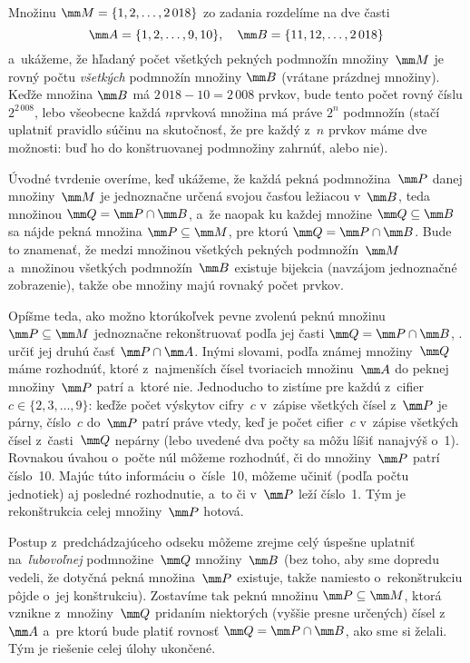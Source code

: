 {%
Množinu $\mm M=\{1,2,\dots,2\,018\}$ zo zadania rozdelíme na dve časti
$$
\mm A=\{1,2,\dots,9,10\},\quad \mm B=\{11,12,\dots,2\,018\}
$$
a~ukážeme, že hľadaný počet všetkých pekných podmnožín množiny~$\mm M$
je rovný počtu {\it všetkých\/} podmnožín množiny $\mm B$ (vrátane
prázdnej množiny). Keďže množina $\mm B$ má ${2\,018-10}=2\,008$
prvkov, bude tento počet rovný číslu $2^{2\,008}$, lebo všeobecne každá
$n$\spojovnik{}prvková množina má práve $2^n$ podmnožín (stačí uplatniť pravidlo
súčinu na skutočnosť, že pre každý z~$n$ prvkov máme dve
možnosti: buď ho do konštruovanej podmnožiny zahrnúť, alebo
nie).

Úvodné tvrdenie overíme, keď ukážeme, že každá pekná podmnožina~$\mm P$
danej množiny~$\mm M$ je jednoznačne určená svojou časťou ležiacou
v~$\mm B$, teda množinou $\mm Q=\mm P\cap \mm B$, a~že naopak ku každej množine
$\mm Q\subseteq \mm B$ sa nájde pekná množina $\mm P\subseteq \mm M$, pre ktorú
$\mm Q=\mm P\cap \mm B$. Bude to znamenať, že medzi množinou všetkých pekných
podmnožín~$\mm M$ a~množinou všetkých podmnožín~$\mm B$ existuje bijekcia (navzájom
jednoznačné zobrazenie), takže obe množiny majú rovnaký počet
prvkov.

Opíšme teda, ako možno ktorúkoľvek pevne zvolenú
peknú množinu $\mm P\subseteq \mm M$ jednoznačne rekonštruovať
podľa jej časti $\mm Q=\mm P\cap \mm B$, \tj. určiť jej druhú časť
$\mm P\cap \mm A$. Inými slovami, podľa známej množiny~$\mm Q$ máme rozhodnúť,
ktoré z~najmenších čísel tvoriacich
množinu~$\mm A$ do peknej množiny~$\mm P$ patrí a~ktoré nie.
Jednoducho to zistíme pre každú z~cifier
$c\in\{2,3,\dots,9\}$: keďže počet výskytov cifry~$c$ v~zápise
všetkých čísel z~$\mm P$ je párny, číslo~$c$ do~$\mm P$ patrí práve vtedy, keď
je počet cifier~$c$ v~zápise všetkých čísel z~časti~$\mm Q$ nepárny
(lebo uvedené dva počty sa môžu líšiť nanajvýš o~1). Rovnakou
úvahou o~počte núl môžeme rozhodnúť, či do množiny~$\mm P$ patrí
číslo~10. Majúc túto informáciu o~čísle~10, môžeme učiniť (podľa počtu
jednotiek) aj posledné rozhodnutie, a~to či v~$\mm P$ leží číslo~1.
Tým je rekonštrukcia celej množiny~$\mm P$ hotová.

Postup z~predchádzajúceho odseku môžeme zrejme celý úspešne uplatniť
na~{\it ľubovoľnej\/} podmnožine~$\mm Q$ množiny~$\mm B$ (bez toho, aby sme dopredu vedeli,
že dotyčná pekná množina~$\mm P$ existuje, takže namiesto o~rekonštrukciu
pôjde o~jej konštrukciu).
Zostavíme tak peknú množinu $\mm P\subseteq \mm M$,
ktorá vznikne z~množiny~$\mm Q$ pridaním niektorých (vyššie presne
určených) čísel z~$\mm A$ a~pre ktorú bude platiť rovnosť
$\mm Q=\mm P\cap \mm B$, ako sme si želali. Tým je
riešenie celej úlohy ukončené.

}

